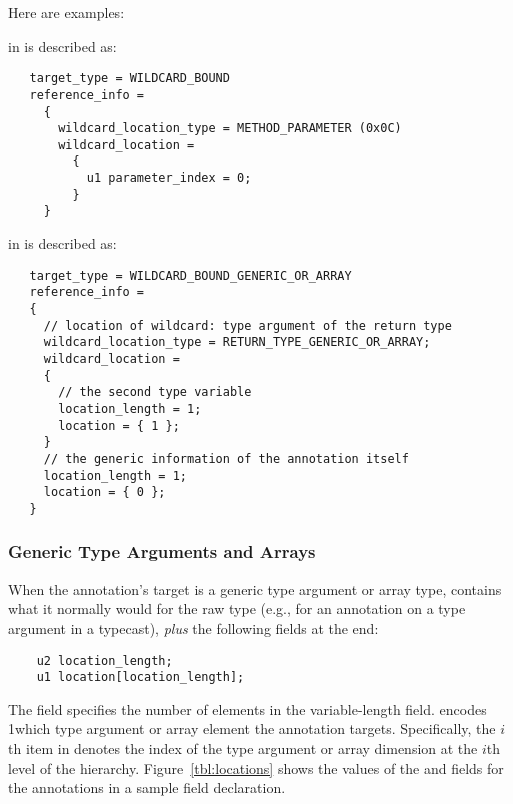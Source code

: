 \documentclass[10pt]{article}
\begin{document}
Here are examples:

\noindent
{} in  is described as:

\begin{Verbatim}
   target_type = WILDCARD_BOUND
   reference_info =
     {
       wildcard_location_type = METHOD_PARAMETER (0x0C)
       wildcard_location =
         {
           u1 parameter_index = 0;
         }
     }
\end{Verbatim}

\noindent
{} in  is described as:

\begin{Verbatim}
   target_type = WILDCARD_BOUND_GENERIC_OR_ARRAY
   reference_info =
   {
     // location of wildcard: type argument of the return type
     wildcard_location_type = RETURN_TYPE_GENERIC_OR_ARRAY;
     wildcard_location =
     {
       // the second type variable
       location_length = 1;
       location = { 1 };
     }
     // the generic information of the annotation itself
     location_length = 1;
     location = { 0 };
   }
\end{Verbatim}

\subsubsection{Generic Type Arguments and Arrays\label{class-file:ext:ri:typearg}}

When the annotation's target is a generic type argument or
array type,
 contains what it normally would for the raw type
(e.g.,  for an annotation on a type argument in a
typecast), {\em plus} the following fields at the end:

\begin{Verbatim}
    u2 location_length;
    u1 location[location_length];
\end{Verbatim}

The  field specifies the number of elements in
the variable-length  field.  encodes
1which type argument or array element the annotation targets.
Specifically, the $i$th item in  denotes the index of
the type argument or array dimension at the $i$th level of the
hierarchy.  Figure~\ref{tbl:locations} shows the values of the
 and  fields for the annotations
in a sample field declaration.
\end{document}
